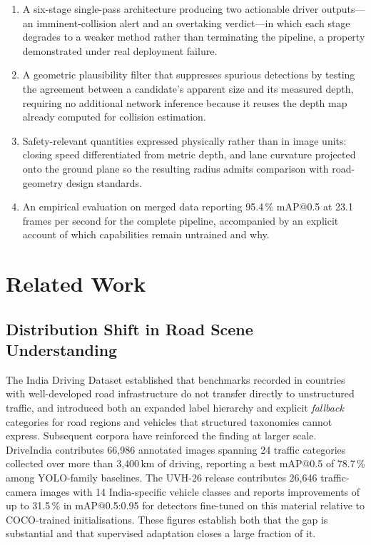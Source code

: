 \documentclass[conference]{IEEEtran}
\begin{document}
\begin{enumerate}
  \item A six-stage single-pass architecture producing two actionable driver
        outputs---an imminent-collision alert and an overtaking verdict---in
        which each stage degrades to a weaker method rather than terminating the
        pipeline, a property demonstrated under real deployment failure.
  \item A geometric plausibility filter that suppresses spurious detections by
        testing the agreement between a candidate's apparent size and its
        measured depth, requiring no additional network inference because it
        reuses the depth map already computed for collision estimation.
  \item Safety-relevant quantities expressed physically rather than in image
        units: closing speed differentiated from metric depth, and lane
        curvature projected onto the ground plane so the resulting radius admits
        comparison with road-geometry design standards.
  \item An empirical evaluation on merged data reporting 95.4\,\% mAP@0.5 at
        23.1\,frames per second for the complete pipeline, accompanied by an
        explicit account of which capabilities remain untrained and why.
\end{enumerate}

\section{Related Work}

\subsection{Distribution Shift in Road Scene Understanding}

The India Driving Dataset \cite{varma2019idd} established that benchmarks
recorded in countries with well-developed road infrastructure do not transfer
directly to unstructured traffic, and introduced both an expanded label
hierarchy and explicit \textit{fallback} categories for road regions and vehicles
that structured taxonomies cannot express. Subsequent corpora have reinforced
the finding at larger scale. DriveIndia \cite{kumar2025driveindia} contributes
66{,}986 annotated images spanning 24 traffic categories collected over more than
3{,}400\,km of driving, reporting a best mAP@0.5 of 78.7\,\% among YOLO-family
baselines. The UVH-26 release \cite{iisc2025uvh26} contributes 26{,}646
traffic-camera images with 14 India-specific vehicle classes and reports
improvements of up to 31.5\,\% in mAP@0.5:0.95 for detectors fine-tuned on this
material relative to COCO-trained initialisations. These figures establish both
that the gap is substantial and that supervised adaptation closes a large
fraction of it.
\end{document}
